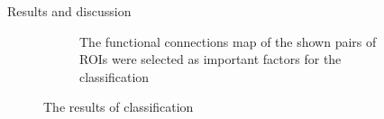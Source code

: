 \documentclass[final]{beamer}
\newlength{\colwidth}
\begin{document}
\begin{frame}[t]
\begin{columns}[t]
\begin{column}{\colwidth}
\begin{block}{Results and discussion}
\begin{figure}[ht]
\begin{subfigure}{0.5\textwidth}
        \caption{The functional connections map of the shown pairs of ROIs were selected as important factors for the classification}
        \label{fig:sub2}
    \end{subfigure}
    \caption{The results of classification}
    \label{fig:both}
\end{figure}




    
\end{block}















\end{column}
\end{columns}
\end{frame}
\end{document}

